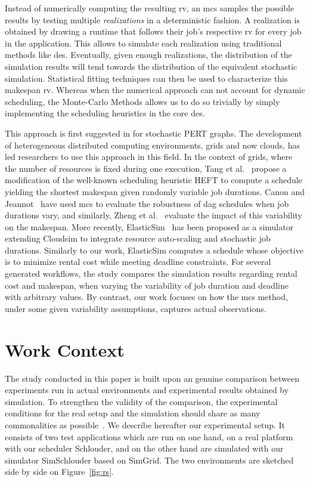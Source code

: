 \documentclass[10pt,conference,compsocconf]{IEEEtran}
\begin{document}
Instead  of numerically computing  the resulting  \ac{rv}, an \ac{mcs} samples the possible
results by testing  multiple \emph{realizations} in a  deterministic fashion.  A
realization is obtained by drawing a runtime that follows their job's respective 
\ac{rv} for  every job in the  application. 
This allows to simulate each realization using traditional
methods like \ac{des}.  Eventually, given enough realizations, the distribution of
the simulation  results will  tend towards the  distribution of  the equivalent
stochastic  simulation.  Statistical  fitting  techniques can  then  be used  to
characterize this makespan \ac{rv}. Whereas when the numerical approach can not 
account for dynamic scheduling, the Monte-Carlo Methods allows us to do so 
trivially by simply implementing the scheduling heuristics in the core \ac{des}.

This approach is first suggested in \cite{Slyke63} for stochastic PERT graphs.
The development  of heterogeneous distributed computing  environments, grids and
now clouds,  has led  researchers to use  this approach in  this field.   In the
context of grids,  where the number of resources is  fixed during one execution,
Tang et  al.~\cite{Tang11} propose a  modification of the  well-known scheduling
heuristic  HEFT to  compute  a  schedule yielding  the  shortest makespan  given
randomly  variable job  durations. Canon and Jeannot~\cite{Canon10} have used  \ac{mcs} to
evaluate  the robustness  of \ac{dag}  schedules when  job durations  vary, and
similarly, Zheng et  al.~\cite{Zheng13} evaluate the impact  of this variability
on the makespan. More  recently, ElasticSim~\cite{Cai17} has been  proposed as a
simulator extending  Cloudsim to integrate resource  auto-scaling and stochastic
job  durations. Similarly  to our  work, ElasticSim  computes a  schedule whose
objective  is  to  minimize  rental  cost while meeting deadline
constraints.  For  several  generated workflows, the  study compares the  simulation results regarding  rental cost
and makespan,  when varying the variability  of job duration and  deadline with
arbitrary  values.  By  contrast,  our  work
focuses on how the \ac{mcs} method, under some given variability assumptions, 
captures actual observations.


\section{Work Context}
\label{sec:work-context}

The  study conducted  in this  paper  is built upon an genuine comparison  between
experiments  run in  actual environments  and experimental  results obtained  by
simulation.   To strengthen  the validity  of the  comparison, the  experimental
conditions  for  the  real  setup  and  the  simulation  should  share  as  many
commonalities  as   possible~\cite{PucherGWK15}.   We  describe   hereafter  our
experimental setup.  It consists of two  test applications which are  run on one
hand, on a real platform with our scheduler Schlouder, and on the other hand are
simulated  with   our  simulator  SimSchlouder   based  on  SimGrid.    The  two
environments are sketched side by side on Figure~\ref{fig:rs}.
\end{document}
